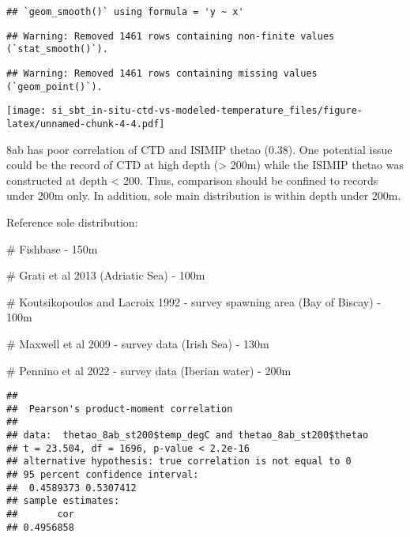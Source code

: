 \documentclass[
]{article}
\newenvironment{Shaded}{\begin{snugshade}}{\end{snugshade}}
\newcommand{\CommentTok}[1]{\textcolor[rgb]{0.56,0.35,0.01}{\textit{#1}}}
\newcommand{\DecValTok}[1]{\textcolor[rgb]{0.00,0.00,0.81}{#1}}
\newcommand{\FunctionTok}[1]{\textcolor[rgb]{0.00,0.00,0.00}{#1}}
\newcommand{\NormalTok}[1]{#1}
\newcommand{\OtherTok}[1]{\textcolor[rgb]{0.56,0.35,0.01}{#1}}
\newcommand{\SpecialCharTok}[1]{\textcolor[rgb]{0.00,0.00,0.00}{#1}}
\begin{document}
\begin{verbatim}
## `geom_smooth()` using formula = 'y ~ x'
\end{verbatim}

\begin{verbatim}
## Warning: Removed 1461 rows containing non-finite values (`stat_smooth()`).
\end{verbatim}

\begin{verbatim}
## Warning: Removed 1461 rows containing missing values (`geom_point()`).
\end{verbatim}

\texttt{[image: si\_sbt\_in-situ-ctd-vs-modeled-temperature\_files/figure-latex/unnamed-chunk-4-4.pdf]}

8ab has poor correlation of CTD and ISIMIP thetao (0.38). One potential
issue could be the record of CTD at high depth (\textgreater{} 200m)
while the ISIMIP thetao was constructed at depth \textless{} 200. Thus,
comparison should be confined to records under 200m only. In addition,
sole main distribution is within depth under 200m.

Reference sole distribution:

\# Fishbase - 150m

\# Grati et al 2013 (Adriatic Sea) - 100m

\# Koutsikopoulos and Lacroix 1992 - survey spawning area (Bay of
Biscay) - 100m

\# Maxwell et al 2009 - survey data (Irish Sea) - 130m

\# Pennino et al 2022 - survey data (Iberian water) - 200m

\begin{Shaded}
\end{Shaded}

\begin{verbatim}
## 
##  Pearson's product-moment correlation
## 
## data:  thetao_8ab_st200$temp_degC and thetao_8ab_st200$thetao
## t = 23.504, df = 1696, p-value < 2.2e-16
## alternative hypothesis: true correlation is not equal to 0
## 95 percent confidence interval:
##  0.4589373 0.5307412
## sample estimates:
##       cor 
## 0.4956858
\end{verbatim}
\end{document}
